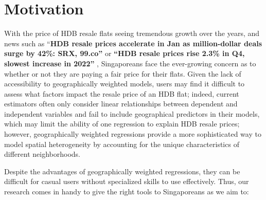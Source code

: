\documentclass[manuscript,screen]{acmart}
\begin{document}
\setlength{\parskip}{-0.1pt}

\hypertarget{motivation}{%
\section{Motivation}\label{motivation}}

With the price of HDB resale flats seeing tremendous growth over the
years, and news such as ``\textbf{HDB resale prices accelerate in Jan as
million-dollar deals surge by 42\%: SRX, 99.co''} \citep{Yong23} or
\textbf{``HDB resale prices rise 2.3\% in Q4, slowest increase in
2022''} \citep{Liew23}, Singaporeans face the ever-growing concern as to
whether or not they are paying a fair price for their flats. Given the
lack of accessibility to geographically weighted models, users may find
it difficult to assess what factors impact the resale price of an HDB
flat; indeed, current estimators often only consider linear
relationships between dependent and independent variables and fail to
include geographical predictors in their models, which may limit the
ability of one regression to explain HDB resale prices; however,
geographically weighted regressions provide a more sophisticated way to
model spatial heterogeneity by accounting for the unique characteristics
of different neighborhoods.

Despite the advantages of geographically weighted regressions, they can
be difficult for casual users without specialized skills to use
effectively. Thus, our research comes in handy to give the right tools
to Singaporeans as we aim to:
\end{document}
